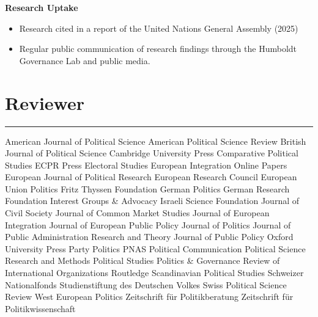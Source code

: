 \vspace{0.8em}

\textbf{Research Uptake}
\begin{itemize}[topsep=0pt, noitemsep, leftmargin=3]
    \item Research cited in a report of the United Nations General Assembly (2025)
    \item Regular public communication of research findings through the Humboldt Governance Lab and public media.
\end{itemize}



\section*{Reviewer}\vspace{-2em}\rule{\textwidth}{0.5pt}\nzb
American Journal of Political Science\nzs
American Political Science Review\nzs
British Journal of Political Science\nzs
Cambridge University Press\nzs
Comparative Political Studies\nzs
ECPR Press\nzs
Electoral Studies\nzs
European Integration Online Papers\nzs
European Journal of Political Research\nzs
European Research Council\nzs
European Union Politics\nzs
Fritz Thyssen Foundation\nzs
German Politics\nzs
German Research Foundation\nzs
Interest Groups \& Advocacy\nzs
Israeli Science Foundation\nzs
Journal of Civil Society\nzs
Journal of Common Market Studies\nzs
Journal of European Integration\nzs
Journal of European Public Policy\nzs
Journal of Politics\nzs
Journal of Public Administration Research and Theory\nzs
Journal of Public Policy\nzs
Oxford University Press\nzs
Party Politics\nzs
PNAS \nzs
Political Communication\nzs
Political Science Research and Methods\nzs
Political Studies\nzs
Politics \& Governance\nzs
Review of International Organizations\nzs
Routledge\nzs
Scandinavian Political Studies\nzs
Schweizer Nationalfonds\nzs
Studienstiftung des Deutschen Volkes\nzs
Swiss Political Science Review\nzs
West European Politics\nzs
Zeitschrift für Politikberatung\nzs
Zeitschrift für Politikwissenschaft









